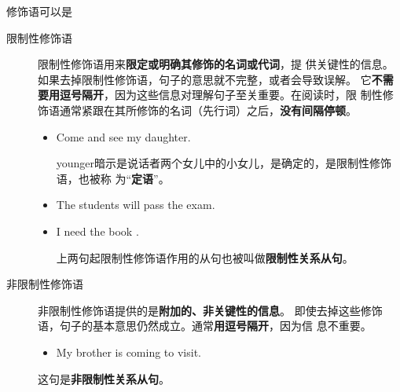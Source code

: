 修饰语可以是
\begin{description}
\item[限制性修饰语] 限制性修饰语用来\textbf{限定或明确其修饰的名词或代词}，提
  供关键性的信息。如果去掉限制性修饰语，句子的意思就不完整，或者会导致误解。
  它\textbf{不需要用逗号隔开}，因为这些信息对理解句子至关重要。在阅读时，限
  制性修饰语通常紧跟在其所修饰的名词（先行词）之后，\textbf{没有间隔停顿}。
  \begin{itemize}

  \item Come and see my  daughter.

    younger暗示是说话者两个女儿中的小女儿，是确定的，是限制性修饰语，也被称
    为“\textbf{定语}”。

  \item The students  will pass the exam.

  \item I need the book .

    上两句起限制性修饰语作用的从句也被叫做\textbf{限制性关系从句}。

  \end{itemize}


\item[非限制性修饰语] 非限制性修饰语提供的是\textbf{附加的、非关键性的信息}。
  即使去掉这些修饰语，句子的基本意思仍然成立。通常\textbf{用逗号隔开}，因为信
  息不重要。
  \begin{itemize}
  \item My brother is coming to visit.
  \end{itemize}

  这句是\textbf{非限制性关系从句}。

\end{description}

